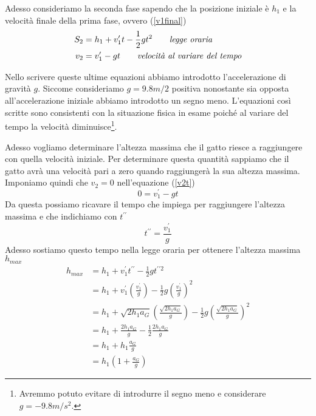 \documentclass{article}
\begin{document}
Adesso consideriamo la seconda fase sapendo che la posizione iniziale è $h_1$ e la velocità finale della prima fase, ovvero (\ref{v1final})
\begin{align}
  S_2 &= h_1 + v^\prime_1 t - \frac{1}{2}g t^2 \qquad\text{\textit{legge oraria}} \\
  v_2 &=v^\prime_1 - g t \qquad\text{\textit{velocità al variare del tempo}} \label{v2t}
\end{align}

Nello scrivere queste ultime equazioni abbiamo introdotto l'accelerazione di gravità $g$. Siccome consideriamo $g=9.8m/2$ positiva nonostante sia opposta all'accelerazione iniziale abbiamo introdotto un segno meno. L'equazioni così scritte sono consistenti con la situazione fisica in esame poiché al variare del tempo la velocità diminuisce\footnote{Avremmo potuto evitare di introdurre il segno meno e considerare $g=-9.8m/s^2$.}. 

Adesso vogliamo determinare l'altezza massima che il gatto riesce a raggiungere con quella velocità iniziale. Per determinare questa quantità sappiamo che il gatto avrà una velocità pari a zero quando raggiungerà la sua altezza massima. Imponiamo quindi che $v_2=0$ nell'equazione (\ref{v2t})
\begin{equation}
  0 = v^\prime_1 -gt 
\end{equation}
Da questa possiamo ricavare il tempo che impiega per raggiungere l'altezza massima e che indichiamo con $t^{\prime\prime}$
\begin{equation}
  t^{\prime\prime} = \frac{v^\prime_1}{g}
\end{equation}
Adesso sostiamo questo tempo nella legge oraria per ottenere l'altezza massima $h_{max}$
\begin{align}
  h_{max} &= h_1 + v^\prime_1 t^{\prime\prime} - \frac{1}{2}g t^{\prime\prime2} \\
          &= h_1 + v^\prime_1 \left(\frac{v^\prime_1}{g}\right) - \frac{1}{2}g \left(\frac{v^\prime_1}{g}\right)^2 \\
          &= h_1 + \sqrt{2h_1 a_G} \left(\frac{\sqrt{2h_1 a_G}}{g}\right) - \frac{1}{2}g \left(\frac{\sqrt{2h_1 a_G}}{g}\right)^2 \\
          &= h_1 + \frac{2h_1 a_G}{g} - \frac{1}{2} \frac{2h_1 a_G}{g} \\
          &= h_1 + h_1 \frac{a_G}{g} \\
          &= h_1\left(1+\frac{a_G}{g}\right) \label{final}
\end{align}
\end{document}
